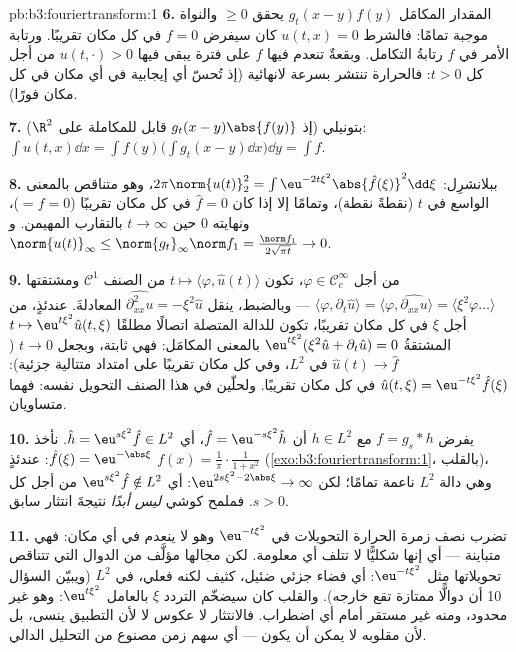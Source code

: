 \begin{solution}{pb:b3:fouriertransform:1}
\textbf{6.} المقدار المكامَل $g_t(x-y)f(y)$ يحقق $\geq 0$ والنواة
موجبة تمامًا: فالشرط $u(t,x) = 0$ كان سيفرض $f = 0$ في كل مكان
تقريبًا. ورتابة الأمر في $f$ رتابةُ التكامل. وبقعةٌ تنعدم فيها
$f$ على فترة يبقى فيها $u(t, \cdot) > 0$ من أجل كل $t > 0$: فالحرارة
تنتشر بسرعة لانهائية (إذ تُحسّ أي إيجابية في أي مكان في كل مكان
فورًا).

\textbf{7.} بتونيلي (إذ $g_t(x-y)\abs{f(y)}$ قابل للمكاملة على $\R^2$):
$\int u(t,x)\dd x = \int f(y)\bigl(\int g_t(x -
y)\dd x\bigr)\dd y = \int f$.

\textbf{8.} ببلانشرِل: $2\pi\norm{u(t)}_2^2 =
\int\eu^{-2t\xi^2}\abs{\hat f(\xi)}^2\dd\xi$، وهو متناقص بالمعنى الواسع في
$t$ (نقطةً نقطة)، وتمامًا إلا إذا كان $\hat f = 0$ في كل مكان
تقريبًا ($= f =
0$)، ونهايته $0$ حين $t\to\infty$ بالتقارب
المهيمن. و $\norm{u(t)}_\infty \leq \norm{g_t}_\infty\norm f_1 =
\frac{\norm f_1}{2\sqrt{\pi t}} \to 0$.

\textbf{9.} من أجل $\varphi \in \mathcal C_c^\infty$، تكون $t \mapsto
\langle\varphi, \hat u(t)\rangle$ من الصنف
$\mathcal C^1$ ومشتقتها $\langle\varphi, \partial_t\hat u\rangle =
\langle\varphi, \widehat{\partial_{xx}u}\rangle =
\langle\xi^2\varphi\dots\rangle$ --- وبالضبط، ينقل $\widehat{\partial^2_{xx}u} = -\xi^2\hat u$
المعادلةَ. عندئذٍ، من أجل $\xi$ في كل مكان تقريبًا، تكون للدالة
المتصلة اتصالًا مطلقًا $t \mapsto \eu^{t\xi^2}\hat u(t,\xi)$ المشتقةُ $\eu^{t\xi^2}(\xi^2\hat u + \partial_t\hat u) = 0$ بالمعنى
المكامَل: فهي ثابتة، وبجعل $t \to 0$ ($\hat u(t) \to \hat f$ في $L^2$، وفي كل
مكان تقريبًا على امتداد متتالية جزئية): $\hat u(t, \xi) = \eu^{-t\xi^2}\hat f(\xi)$ في كل مكان
تقريبًا. ولحلّين في هذا الصنف التحويل نفسه: فهما متساويان.

\textbf{10.} يفرض $f = g_s * h$ مع $h \in L^2$ أن $\hat f =
\eu^{-s\xi^2}\hat h$، أي
$\hat h = \eu^{s\xi^2}\hat f \in
L^2$. نأخذ $\hat f(\xi) = \eu^{-\abs\xi}$: عندئذٍ $f(x) =
\frac1\pi\cdot\frac1{1 + x^2}$ (\cref{exo:b3:fouriertransform:1}، بالقلب)،
وهي دالة $L^2$ ناعمة تمامًا؛ لكن $\eu^{2s\xi^2 - 2\abs\xi} \to
\infty$: أي $\eu^{s\xi^2}\hat f \notin L^2$ من أجل كل
$s > 0$. فملمح كوشي \emph{ليس أبدًا} نتيجةَ انتثار سابق.

\textbf{11.} تضرب نصف زمرة الحرارة التحويلات في $\eu^{-t\xi^2}$
وهو لا ينعدم في أي مكان: فهي متباينة --- أي إنها شكليًّا لا
تتلف أي معلومة. لكن مجالها مؤلَّف من الدوال التي تتناقص
تحويلاتها مثل $\eu^{-t\xi^2}$: أي فضاء جزئي ضئيل، كثيف لكنه
فعلي، في $L^2$ (ويبيّن السؤال 10 أن دوالًّا ممتازة تقع خارجه).
والقلب كان سيضخّم التردد $\xi$ بالعامل $\eu^{t\xi^2}$: وهو غير
محدود، ومنه غير مستقر أمام أي اضطراب. فالانتثار لا عكوس لا لأن
التطبيق ينسى، بل لأن مقلوبه لا يمكن أن يكون  --- أي سهم
زمن مصنوع من التحليل الدالي.


\end{solution}
